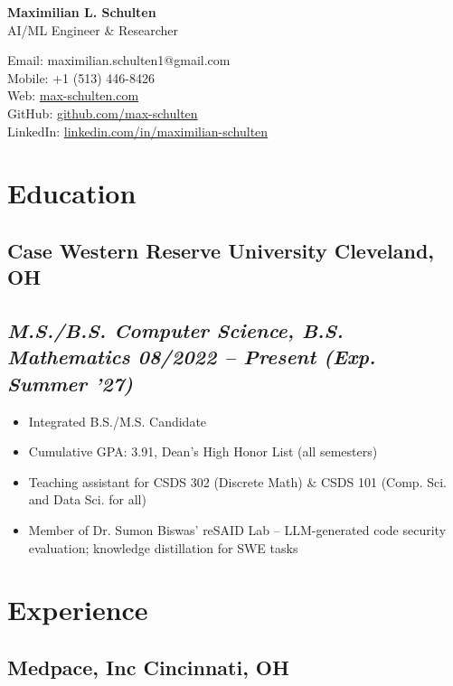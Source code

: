 \documentclass[10pt]{article} %
\begin{document}
\begin{center}
	\begin{minipage}{0.5\textwidth}
		{\huge\bfseries
			Maximilian L. Schulten
		} \\ \medskip
		AI/ML Engineer \& Researcher
	\end{minipage} \hfill
	\begin{minipage}{0.4\textwidth}
		\raggedleft
		Email: maximilian.schulten1@gmail.com \\
		Mobile: +1 (513) 446-8426 \\
		Web: \href{https://max-schulten.com}{max-schulten.com} \\
		GitHub: \href{https://github.com/max-schulten}{github.com/max-schulten} \\
		LinkedIn: \href{https://www.linkedin.com/in/maximilian-schulten-b78099271/}{linkedin.com/in/maximilian-schulten}
	\end{minipage}
\end{center}

\section{Education}
\subsection{Case Western Reserve University \hfill Cleveland, OH}
\subsection{\normalfont\itshape M.S./B.S. Computer Science, B.S. Mathematics \hfill 08/2022 -- Present (Exp. Summer '27)}
\begin{itemize}
	\item Integrated B.S./M.S. Candidate
	\item Cumulative GPA: 3.91, Dean's High Honor List (all semesters)
	\item Teaching assistant for CSDS 302 (Discrete Math) \& CSDS 101 (Comp. Sci. and Data Sci. for all)
	\item Member of Dr. Sumon Biswas' reSAID Lab -- LLM-generated code security evaluation; knowledge distillation for SWE tasks
\end{itemize}

\section{Experience}
\subsection{Medpace, Inc \hfill Cincinnati, OH}
\end{document}
